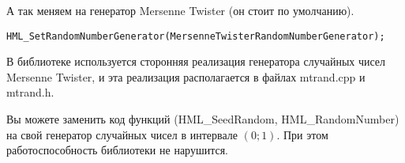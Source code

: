 А так меняем на генератор Mersenne Twister (он стоит по умолчанию).
\begin{lstlisting}[label=SetRandomNumberGenerator,caption=Меняем на генератор случайных чисел Mersenne Twister]
HML_SetRandomNumberGenerator(MersenneTwisterRandomNumberGenerator);
\end{lstlisting}

В библиотеке используется сторонняя реализация генератора случайных чисел Mersenne Twister, и эта реализация располагается в файлах mtrand.cpp и mtrand.h.

Вы можете заменить код функций (HML\_SeedRandom, HML\_RandomNumber) на свой генератор случайных чисел в интервале $\left( 0; 1\right)$. При этом работоспособность библиотеки не нарушится.